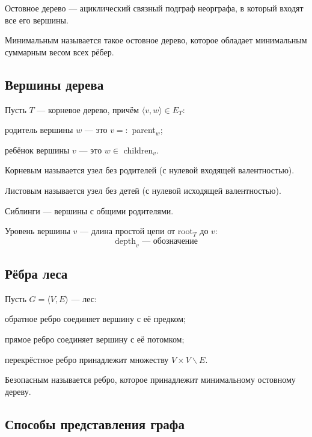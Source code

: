 {\bold Остовное дерево} --- ациклический связный подграф неорграфа, в который входят все его вершины.

{\bold Минимальным} называется такое {\ital остовное дерево}, которое обладает минимальным суммарным весом всех рёбер.

\subsection{Вершины дерева}

Пусть $T$ --- корневое дерево, причём $\langle v,w\rangle\in E_T$:

\begin{list*}
\item{\bold родитель} вершины $w$ --- это $v=:$ parent$_w$;
\item{\bold ребёнок} вершины $v$ --- это $w\in$ children$_v$.
\end{list*}

{\bold Корневым} называется узел без родителей {\ital (с нулевой входящей валентностью)}.

{\bold Листовым} называется узел без детей {\ital (с нулевой исходящей валентностью)}.

{\bold Сиблинги} --- вершины с общими родителями.

{\bold Уровень} вершины $v$ --- длина простой цепи от root$_T$ до $v$:
$$\text{depth}_v\text{ --- обозначение}$$

\subsection{Рёбра леса}

Пусть $G=\langle V,E\rangle$ --- лес:

\begin{list*}
\item{\bold обратное} ребро соединяет вершину с её {\ital предком};
\item{\bold прямое} ребро соединяет вершину с её {\ital потомком};
\item{\bold перекрёстное} ребро принадлежит множеству $V\times V\backslash E$.
\end{list*}

{\bold Безопасным} называется ребро, которое принадлежит {\ital минимальному остовному дереву}.

\subsection{Способы представления графа}

